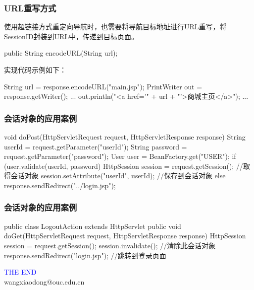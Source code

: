\begin{frame}[fragile] %
\frametitle{URL重写方式} 

使用超链接方式重定向导航时，也需要将导航目标地址进行URL重写，将SessionID封装到URL中，传递到目标页面。
\begin{javaCode}
public String encodeURL(String url);
\end{javaCode}

实现代码示例如下：
\begin{javaCode}
String url = response.encodeURL("main.jsp");
PrintWriter out = response.getWriter();
...
out.println("<a href='" + url + "'>商城主页</a>");
... 
\end{javaCode}
\end{frame}

\begin{frame}[fragile] %
\frametitle{会话对象的应用案例} 

\begin{javaCode}
void doPost(HttpServletRequest request, HttpServletResponse response) {
  String userId = request.getParameter("userId");
  String password = request.getParameter("password");
  User user = BeanFactory.get("USER");
  if (user.validate(userId, password) {
    HttpSession session = request.getSession();  //取得会话对象
    session.setAttribute("userId", userId);  //保存到会话对象
  } else {
    response.sendRedirect("../login.jsp");
  }
}
\end{javaCode}
\end{frame}

\begin{frame}[fragile] %
\frametitle{会话对象的应用案例} 

\begin{javaCode}
public class LogoutAction extends HttpServlet {
  public void doGet(HttpServletRequest request, HttpServletResponse response) {
    HttpSession session = request.getSession();
    session.invalidate(); //清除此会话对象
    response.sendRedirect("login.jsp"); //跳转到登录页面
  }
}
\end{javaCode}
\end{frame}
\begin{frame}
\centering
{\Huge \textcolor{blue}{THE END}} \\
\vspace{5mm}
{\Large wangxiaodong@ouc.edu.cn} \\
\end{frame}

